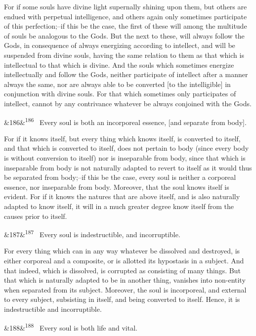 \documentclass[12pt]{article}
\newcommand{\para}[1][]{\par\noindent\ifx&#1&\else\textsuperscript{\footnotesize #1}~\fi}
\begin{document}
For if some souls have divine light supernally shining upon them, but others are endued with perpetual intelligence, and others again only sometimes participate of this perfection;--if this be the case, the first of these will among the multitude of souls be analogous to the Gods. But the next to these, will always follow the Gods, in consequence of always energizing according to intellect, and will be suspended from divine souls, having the same relation to them as that which is intellectual to that which is divine. And the souls which sometimes energize intellectually and follow the Gods, neither participate of intellect after a manner always the same, nor are always able to be converted [to the intelligible] in conjunction with divine souls. For that which sometimes only participates of intellect, cannot by any contrivance whatever be always conjoined with the Gods.

\para[186] Every soul is both an incorporeal essence, [and separate from body].

For if it knows itself, but every thing which knows itself, is converted to itself, and that which is converted to itself, does not pertain to body (since every body is without conversion to itself) nor is inseparable from body, since that which is inseparable from body is not naturally adapted to revert to itself as it would thus be separated from body;--if this be the case, every soul is neither a corporeal essence, nor inseparable from body. Moreover, that the soul knows itself is evident. For if it knows the natures that are above itself, and is also naturally adapted to know itself, it will in a much greater degree know itself from the causes prior to itself.

\para[187] Every soul is indestructible, and incorruptible.

For every thing which can in any way whatever be dissolved and destroyed, is either corporeal and a composite, or is allotted its hypostasis in a subject. And that indeed, which is dissolved, is corrupted as consisting of many things. But that which is naturally adapted to be in another thing, vanishes into non-entity when separated from its subject. Moreover, the soul is incorporeal, and external to every subject, subsisting in itself, and being converted to itself. Hence, it is indestructible and incorruptible.

\para[188] Every soul is both life and vital.
\end{document}
